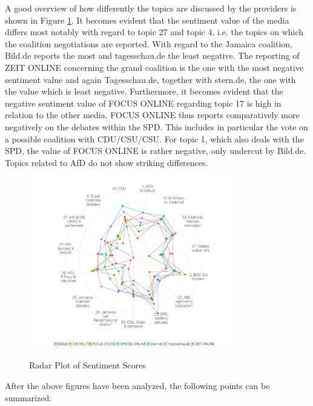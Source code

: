\documentclass[12pt,a4paper,notitlepage]{article}
\begin{document}
A good overview of how differently the topics are discussed by the providers is shown in Figure \ref{fig_sentscore_radar}. It becomes evident that the sentiment value of the media differs most notably with regard to topic 27 and topic 4, i.e. the topics on which the coalition negotiations are reported. With regard to the Jamaica coalition, Bild.de reports the most and tagesschau.de the least negative. The reporting of ZEIT ONLINE concerning the grand coalition is the one with the most negative sentiment value and again Tagesschau.de, together with stern.de, the one with the value which is least negative. Furthermore, it becomes evident that the negative sentiment value of FOCUS ONLINE regarding topic 17 is high in relation to the other media. FOCUS ONLINE thus reports comparatively more negatively on the debates within the SPD. This includes in particular the vote on a possible coalition with CDU/CSU/CSU. For topic 1, which also deals with the SPD, the value of FOCUS ONLINE is rather negative, only undercut by Bild.de. Topics related to AfD do not show striking differences. 

\begin{figure}[H]
	\caption{Radar Plot of Sentiment Scores}
	\begin{center}
			\includegraphics[width=0.8\textwidth,keepaspectratio]{../figs/sentscore_radar.png}
			\label{fig_sentscore_radar}
	\end{center}
\end{figure}

After the above figures have been analyzed, the following points can be summarized:
\end{document}
